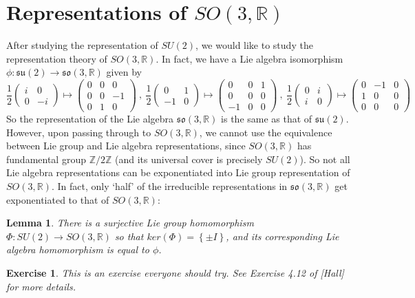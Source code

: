 \documentclass[11pt]{book}
\newtheorem{lemma}[theorem]{Lemma}
\newtheorem{exercise}[theorem]{Exercise}
\newcommand{\bb}[1]{\mathbb{#1}}
\newcommand{\mf}[1]{\mathfrak{#1}}
\begin{document}
\section{Representations of $SO(3,\bb{R})$}
After studying the representation of $SU(2)$, we would like to study the representation theory of $SO(3,\bb{R})$. In fact, we have a Lie algebra isomorphism $\phi: \mf{su}(2) \to \mf{so}(3,\bb{R})$ given by\small{
$$\frac{1}{2} \left( \begin{array}{cc}
i & 0 \\
0 & -i \end{array} \right) \mapsto \left( \begin{array}{ccc}
0 & 0 & 0 \\
0& 0& -1\\
0 & 1 & 0 \end{array} \right)\ ,\ \frac{1}{2} \left( \begin{array}{cc}
0 & 1 \\
-1 & 0 \end{array} \right) \mapsto \left( \begin{array}{ccc}
0 & 0 & 1 \\
0& 0& 0\\
-1 & 0 & 0 \end{array} \right)\ ,\ \frac{1}{2} \left( \begin{array}{cc}
0 & i \\
i & 0 \end{array} \right) \mapsto \left( \begin{array}{ccc}
0 & -1 & 0 \\
1& 0& 0\\
0 & 0 & 0 \end{array} \right)$$}
So the representation of the Lie algebra $\mf{so}(3,\bb{R})$ is the same as that of $\mf{su}(2)$. However, upon passing through to $SO(3,\bb{R})$, we cannot use the equivalence between Lie group and Lie algebra representations, since $SO(3,\bb{R})$ has fundamental group $\bb{Z}/2\bb{Z}$ (and its universal cover is precisely $SU(2)$). So not all Lie algebra representations can be exponentiated into Lie group representation of $SO(3,\bb{R})$. In fact, only `half' of the irreducible representations in $\mf{so}(3,\bb{R})$ get exponentiated to that of $SO(3,\bb{R})$:
\begin{lemma}
There is a surjective Lie group homomorphism $\Phi: SU(2) \to SO(3,\bb{R})$ so that $ker(\Phi) = \left\{\pm I\right\}$, and its corresponding Lie algebra homomorphism is equal to $\phi$.
\end{lemma}
\begin{exercise}
This is an exercise everyone should try. See Exercise 4.12 of [Hall] for more details.
\end{exercise}
\end{document}
